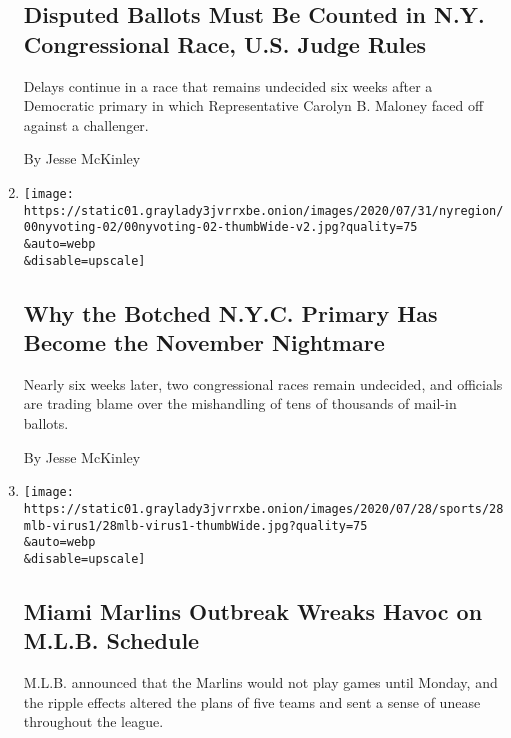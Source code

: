 \begin{enumerate}
  \hypertarget{disputed-ballots-must-be-counted-in-ny-congressional-race-us-judge-rules}{%
  \subsection{Disputed Ballots Must Be Counted in N.Y. Congressional
  Race, U.S. Judge
  Rules}\label{disputed-ballots-must-be-counted-in-ny-congressional-race-us-judge-rules}}

  Delays continue in a race that remains undecided six weeks after a
  Democratic primary in which Representative Carolyn B. Maloney faced
  off against a challenger.

  By Jesse McKinley
\item
  \href{/2020/08/03/nyregion/nyc-mail-ballots-voting.html}{}

  \texttt{[image: https://static01.graylady3jvrrxbe.onion/images/2020/07/31/nyregion/00nyvoting-02/00nyvoting-02-thumbWide-v2.jpg?quality=75\\\&auto=webp\\\&disable=upscale]}

  \hypertarget{why-the-botched-nyc-primary-has-become-the-november-nightmare}{%
  \subsection{Why the Botched N.Y.C. Primary Has Become the November
  Nightmare}\label{why-the-botched-nyc-primary-has-become-the-november-nightmare}}

  Nearly six weeks later, two congressional races remain undecided, and
  officials are trading blame over the mishandling of tens of thousands
  of mail-in ballots.

  By Jesse McKinley
\item
  \href{/2020/07/28/sports/baseball/marlins-outbreak-mlb-coronavirus.html}{}

  \texttt{[image: https://static01.graylady3jvrrxbe.onion/images/2020/07/28/sports/28mlb-virus1/28mlb-virus1-thumbWide.jpg?quality=75\\\&auto=webp\\\&disable=upscale]}

  \hypertarget{miami-marlins-outbreak-wreaks-havoc-on-mlb-schedule}{%
  \subsection{Miami Marlins Outbreak Wreaks Havoc on M.L.B.
  Schedule}\label{miami-marlins-outbreak-wreaks-havoc-on-mlb-schedule}}

  M.L.B. announced that the Marlins would not play games until Monday,
  and the ripple effects altered the plans of five teams and sent a
  sense of unease throughout the league.


\end{enumerate}
